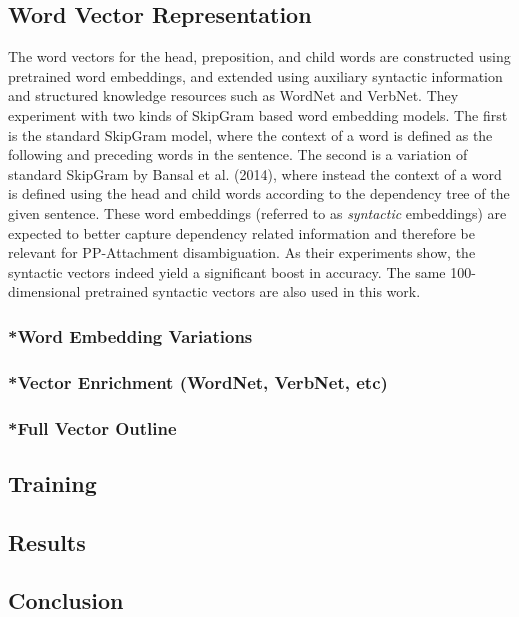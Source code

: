\subsection{Word Vector Representation}

The word vectors for the head, preposition, and child words are constructed using pretrained word embeddings, and extended using auxiliary syntactic information and structured knowledge resources such as WordNet and VerbNet. They experiment with two kinds of SkipGram based word embedding models. The first is the standard SkipGram model, where the context of a word is defined as the following and preceding words in the sentence. The second is a variation of standard SkipGram by Bansal et al. (2014), where instead the context of a word is defined using the head and child words according to the dependency tree of the given sentence. These word embeddings (referred to as \textit{syntactic} embeddings) are expected to better capture dependency related information and therefore be relevant for PP-Attachment disambiguation. As their experiments show, the syntactic vectors indeed yield a significant boost in accuracy. The same 100-dimensional pretrained syntactic vectors are also used in this work.





\subsubsection{*Word Embedding Variations}
\subsubsection{*Vector Enrichment (WordNet, VerbNet, etc)}
\subsubsection{*Full Vector Outline}
\subsection{Training}
\subsection{Results}
\subsection{Conclusion}
\pagebreak


